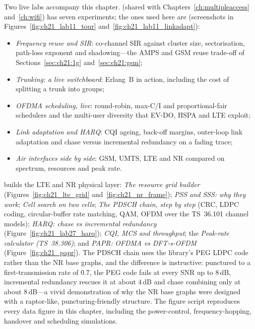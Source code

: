 
\begin{labbox}
Two live labs accompany this chapter.  (shared
with Chapters~\ref{ch:multipleaccess} and~\ref{ch:wifi}) has seven experiments; the ones used here
are (screenshots in Figures~\ref{fig:ch21_lab11_tour} and~\ref{fig:ch21_lab11_linkadapt}):
\begin{itemize}
\item \emph{Frequency reuse and SIR}: co-channel SIR against cluster size, sectorisation, path-loss
exponent and shadowing---the AMPS and GSM reuse trade-off of Sections~\ref{sec:ch21:1g}
and~\ref{sec:ch21:gsm};
\item \emph{Trunking: a live switchboard}: Erlang~B in action, including the cost of splitting a
trunk into groups;
\item \emph{OFDMA scheduling, live}: round-robin, max-C/I and proportional-fair schedulers and the
multi-user diversity that EV-DO, HSPA and LTE exploit;
\item \emph{Link adaptation and HARQ}: CQI ageing, back-off margins, outer-loop link adaptation and
chase versus incremental redundancy on a fading trace;
\item \emph{Air interfaces side by side}: GSM, UMTS, LTE and NR compared on spectrum, resources and
peak rate.
\end{itemize}
 builds the LTE and NR physical layer: \emph{The
resource grid builder} (Figures~\ref{fig:ch21_lte_grid} and~\ref{fig:ch21_nr_frame}); \emph{PSS and
SSS: why they work}; \emph{Cell search on two cells}; \emph{The PDSCH chain, step by step} (CRC, LDPC
coding, circular-buffer rate matching, QAM, OFDM over the TS~36.101 channel models); \emph{HARQ: chase
vs incremental redundancy} (Figure~\ref{fig:ch21_lab27_harq}); \emph{CQI, MCS and throughput}; the \emph{Peak-rate calculator
(TS~38.306)}; and \emph{PAPR: OFDMA vs DFT-s-OFDM} (Figure~\ref{fig:ch21_papr}). The PDSCH chain uses the library's PEG LDPC code rather than the NR base graphs, and the
difference is instructive: punctured to a first-transmission rate of 0.7, the PEG code fails at every
SNR up to 8\,dB, incremental redundancy rescues it at about 4\,dB and chase combining only at about
8\,dB---a vivid demonstration of why the NR base graphs were designed with a raptor-like,
puncturing-friendly structure. The figure script  reproduces every
data figure in this chapter, including the power-control, frequency-hopping, handover and scheduling
simulations.
\end{labbox}

